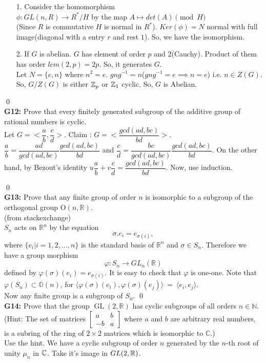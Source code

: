 \begin{itemize}
	\item[1.] Consider the homomorphism\\
	$ \phi: GL(n,R)\to R^*/H $ by the map $ A\mapsto det(A) \pmod{H} $\\
	(Since $ R $ is commutative $ H $ is normal in $ R^* $). $ Ker(\phi) = N $ normal with full image(diagonal with a entry $ r $ and rest $ 1 $). So, we have the isomorphism.
	\item[2.] If $ G $ is abelian. $ G $ has element of order $ p $ and $ 2 $(Cauchy). Product of them has order $ lcm(2,p)=2p $. So, it generates $ G $.\\
	Let $ N=\{e,n\} $ where $ n^2=e $. $ gng^{-1}=n $($gng^{-1} =e \implies n=e$) i.e. $ n\in Z(G) $. So, $ G/Z(G) $ is either $ \mathbb{Z}_p $ or $ \mathbb{Z}_1 $ cyclic. So, $ G $ is Abelian.  
\end{itemize}
\qed\\
\textbf{G12:} Prove that every finitely generated subgroup of the additive group of rational numbers is cyclic.\\
\soln
Let $ G =<\dfrac{a}{b},\dfrac{c}{d}>$. Claim : $ G= <\dfrac{gcd(ad,bc)}{bd}> $. $ \dfrac{a}{b}= \dfrac{ad}{gcd(ad,bc)} \dfrac{gcd(ad,bc)}{bd}$ and $ \dfrac{c}{d}= \dfrac{bc}{gcd(ad,bc)} \dfrac{gcd(ad,bc)}{bd}$. On the other hand, by Bezout's identity $u\dfrac{a}{b}+v\dfrac{c}{d}= \dfrac{gcd(ad,bc)}{bd}  $. Now, use induction.

\qed\\

\textbf{G13:} Prove that any finite group of order $n$ is isomorphic to a subgroup of the orthogonal group $\mathrm{O}(n, \mathbb{R})$.\\

\soln(from stackexchange)\\
$S_{n}$ acts on $\mathbb{R}^n$ by the equation $$ \sigma . e_i= e_{\sigma(i)},$$ 
where $\lbrace e_i \vert i= 1,2,...,n\rbrace $ is the standard basis of $\mathbb{R}^n$ and $\sigma \in S_n$. Therefore we have a group morphism $$\varphi : S_n \rightarrow GL_n(\mathbb{R})$$ defined by $\varphi(\sigma)(e_i)= e_{\sigma(i)}.$
It is easy to check that $\varphi$ is one-one. Note that $\varphi(S_n) \subset \mathbb{O}(n)$, for $\langle \varphi(\sigma)(e_i), \varphi(\sigma)(e_j)\rangle~= ~\langle e_i, e_j\rangle$.\\
Now any finite group is a subgroup of $ S_n $.
\qed\\

\textbf{G14:} Prove that the group $\operatorname{GL}(2, \mathbb{R})$ has cyclic subgroups of all orders $n \in \mathbb{N}$. (Hint: The set of matrices $\left[\begin{array}{cc}a & b \\ -b & a\end{array}\right]$ where $a$ and $b$ are arbitrary real numbers, is a subring of the ring of $2 \times 2$ matrices which is isomorphic to $\mathbb{C}$.)\\
\soln
Use the hint. We have a cyclic subgroup of order $ n $ generated by the $ n $-th root of unity $ \mu_n  $ in $ \mathbb{C} $. Take it's image in $ GL(2,\mathbb{R}) $.

